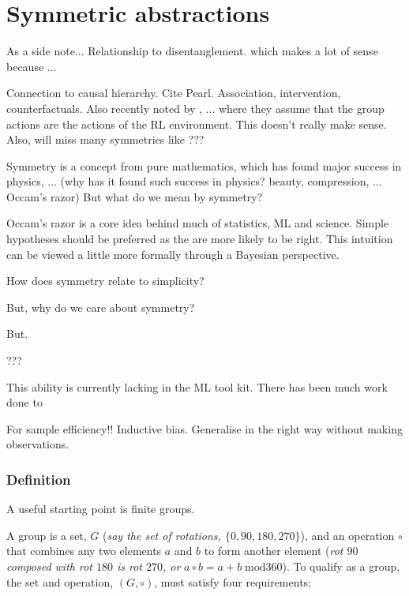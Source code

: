 \newpage
\section{Symmetric abstractions}\label{symmetric-abstractions}


As a side note...
Relationship to disentanglement. \cite{Higgins2018} which makes a lot of sense because ...

Connection to causal hierarchy. Cite Pearl. Association, intervention, counterfactuals.
Also recently noted by \cite{Caselles-Dupre2019}, ... where they assume that
the group actions are the actions of the RL environment.
This doesn't really make sense. Also, will miss many symmetries like ???


Symmetry is a concept from pure mathematics, which has found major success in physics, ...
(why has it found such success in physics? beauty, compression, ... Occam's razor)
But what do we mean by symmetry?



Occam's razor is a core idea behind much of statistics, ML and science. Simple
hypotheses should be preferred as the are more likely to be right. This intuition
can be viewed a little more formally through a Bayesian perspective.

How does symmetry relate to simplicity?

But, why do we care about symmetry?

But.

???

This ability is currently lacking in the ML tool kit. There has been much work done to

For sample efficiency!! Inductive bias. Generalise in the right way without making observations.

\subsubsection{Definition}

A useful starting point is finite groups.

A group is a set, $G$ (\textit{say the set of rotations, $\{0, 90, 180, 270\}$}),
and an operation $\circ$ that combines any two elements $a$ and $b$ to form
another element (\textit{rot $90$ composed with rot $180$ is rot $270$, or} $a \circ b = a + b \;\text{mod} 360$).
To qualify as a group, the set and operation, $(G, \circ)$, must satisfy four requirements;


